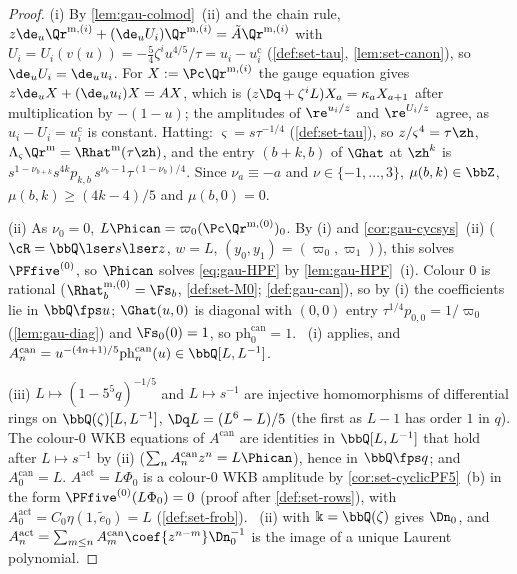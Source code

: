 \begin{proof}
(i) By \cref{lem:gau-colmod}~(ii) and the chain rule, $z\de_u\Qr^{\mathrm m,(i)}+(\de_uU_i)\Qr^{\mathrm m,(i)}=\tilde A\Qr^{\mathrm m,(i)}$ with $U_i=U_i(v(u))=-\frac54\zeta^iu^{4/5}/\tau=u_i-u_i^{\mathrm c}$ (\cref{def:set-tau}, \cref{lem:set-canon}), so $\de_uU_i=\de_uu_i$. For $X:=\Pc\Qr^{\mathrm m,(i)}$ the gauge equation gives $z\de_uX+(\de_uu_i)X=AX$, which is $(z\Dq+\zeta^iL)X_a=\kappa_aX_{a+1}$ after multiplication by $-(1-u)$; the amplitudes of $\re^{u_i/z}$ and $\re^{U_i/z}$ agree, as $u_i-U_i=u_i^{\mathrm c}$ is constant. Hatting: $\varsigma=s\tau^{-1/4}$ (\cref{def:set-tau}), so $z/\varsigma^4=\tau\zh$, $\Lambda_\varsigma\Qr^{\mathrm m}=\Rhat^{\mathrm m}(\tau\zh)$, and the entry $(b+k,b)$ of $\Ghat$ at $\zh^k$ is $s^{1-\nu_{b+k}}s^{4k}p_{k,b}\,s^{\nu_b-1}\tau^{(1-\nu_b)/4}$. Since $\nu_a\equiv-a$ and $\nu\in\{-1,\dots,3\}$, $\mu(b,k)\in\bbZ$, $\mu(b,k)\geq(4k-4)/5$ and $\mu(b,0)=0$.

(ii) As $\nu_0=0$, $L\Phican=\varpi_0(\Pc\Qr^{\mathrm m,(0)})_0$. By (i) and \cref{cor:gau-cycsys}~(ii) ($\cR=\bbQ\lser s\lser z$, $w=L$, $(y_0,y_1)=(\varpi_0,\varpi_1)$), this solves $\PFfive^{(0)}$, so $\Phican$ solves \eqref{eq:gau-HPF} by \cref{lem:gau-HPF}~(i). Colour $0$ is rational ($\Rhat^{\mathrm m,(0)}_b=\Fs_b$, \cref{def:set-M0}; \cref{def:gau-can}), so by (i) the coefficients lie in $\bbQ\fps u$; $\Ghat(u,0)$ is diagonal with $(0,0)$ entry $\tau^{1/4}p_{0,0}=1/\varpi_0$ (\cref{lem:gau-diag}) and $\Fs_0(0)=1$, so $\mathrm{ph}^{\mathrm{can}}_0=1$. ~(i) applies, and $A^{\mathrm{can}}_n=u^{-(4n+1)/5}\mathrm{ph}^{\mathrm{can}}_n(u)\in\bbQ[L,L^{-1}]$.

(iii) $L\mapsto(1-5^5q)^{-1/5}$ and $L\mapsto s^{-1}$ are injective homomorphisms of differential rings on $\bbQ(\zeta)[L,L^{-1}]$, $\Dq L=(L^6-L)/5$ (the first as $L-1$ has order $1$ in $q$). The colour-$0$ WKB equations of $A^{\mathrm{can}}$ are identities in $\bbQ[L,L^{-1}]$ that hold after $L\mapsto s^{-1}$ by (ii) ($\sum_nA^{\mathrm{can}}_nz^n=L\Phican$), hence in $\bbQ\fps q$; and $A^{\mathrm{can}}_0=L$. $A^{\mathrm{act}}=L\Phi_0$ is a colour-$0$ WKB amplitude by \cref{cor:set-cyclicPF5}~(b) in the form $\PFfive^{(0)}(L\Phi_0)=0$ (proof after \cref{def:set-rows}), with $A^{\mathrm{act}}_0=C_0\eta(1,\tilde e_0)=L$ (\cref{def:set-frob}). ~(ii) with $\Bbbk=\bbQ(\zeta)$ gives $\Dn_0$, and $A^{\mathrm{act}}_n=\sum_{m\leq n}A^{\mathrm{can}}_m\coef{z^{n-m}}\Dn_0^{-1}$ is the image of a unique Laurent polynomial.


\end{proof}
